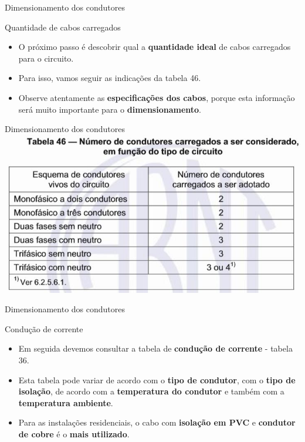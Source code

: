 \begin{frame}{Dimensionamento dos condutores}
	\begin{block}{Quantidade de cabos carregados}
		\begin{itemize}
			\item O próximo passo é descobrir qual a \textbf{quantidade ideal} de cabos carregados para o circuito.
			\item Para isso, vamos seguir as indicações da tabela 46.
			\item Observe atentamente as \textbf{especificações dos cabos}, porque esta informação será muito importante para o \textbf{dimensionamento}.
		\end{itemize}
	\end{block}
\end{frame}


\begin{frame}{Dimensionamento dos condutores}
	\centering
	\includegraphics[width=1\linewidth]{Figuras/Ch06/fig3}
\end{frame}


\begin{frame}{Dimensionamento dos condutores}
	\begin{block}{Condução de corrente}
		\begin{itemize}
			\item Em seguida devemos consultar a tabela de \textbf{condução de corrente} - tabela 36.
			\item Esta tabela pode variar de acordo com o \textbf{tipo de condutor}, com o \textbf{tipo de isolação}, de acordo com a \textbf{temperatura do condutor} e também com a \textbf{temperatura ambiente}.
			\item Para as instalações residenciais, o cabo com \textbf{isolação em PVC} e \textbf{condutor de cobre} é o \textbf{mais utilizado}.
		\end{itemize}
	\end{block}
\end{frame}

